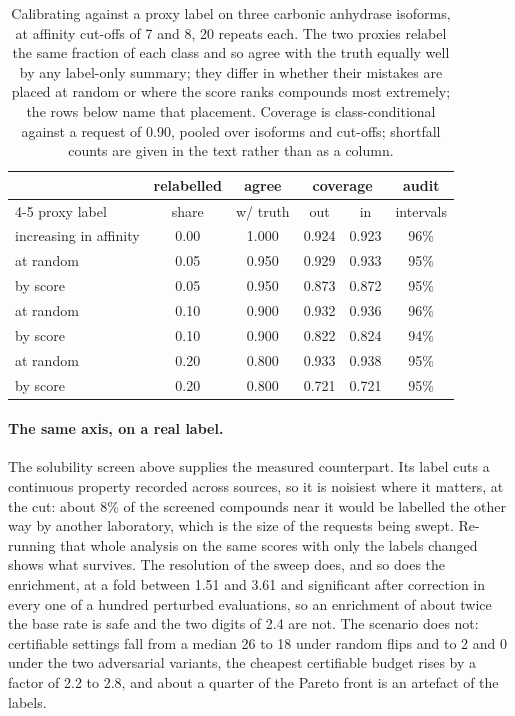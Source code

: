 \documentclass[twocolumn,10pt]{article}
\begin{document}
\begin{table}[t]
\centering
\caption{Calibrating against a proxy label on three carbonic anhydrase isoforms, at affinity cut-offs of 7 and 8, 20 repeats each. The two proxies relabel the same fraction of each class and so agree with the truth equally well by any label-only summary; they differ in whether their mistakes are placed at random or where the score ranks compounds most extremely; the rows below name that placement. Coverage is class-conditional against a request of 0.90, pooled over isoforms and cut-offs; shortfall counts are given in the text rather than as a column.}
\label{tab:surrogate}
\footnotesize
\setlength{\tabcolsep}{4pt}
\begin{tabular}{lccccc}
\toprule
 & relabelled & agree & \multicolumn{2}{c}{coverage} & audit \\
\cmidrule(lr){4-5}
proxy label & share & w/ truth & out & in & intervals \\
\midrule
increasing in affinity & 0.00 & 1.000 & 0.924 & 0.923 & 96\% \\
at random & 0.05 & 0.950 & 0.929 & 0.933 & 95\% \\
by score  & 0.05 & 0.950 & 0.873 & 0.872 & 95\% \\
at random & 0.10 & 0.900 & 0.932 & 0.936 & 96\% \\
by score  & 0.10 & 0.900 & 0.822 & 0.824 & 94\% \\
at random & 0.20 & 0.800 & 0.933 & 0.938 & 95\% \\
by score  & 0.20 & 0.800 & 0.721 & 0.721 & 95\% \\
\bottomrule
\end{tabular}
\end{table}


\paragraph{The same axis, on a real label.} The solubility screen above supplies the measured
counterpart. Its label cuts a continuous property recorded across sources, so it is noisiest
where it matters, at the cut: about 8\% of the screened compounds near it would be labelled the
other way by another laboratory, which is the size of the requests being swept. Re-running that
whole analysis on the same scores with only the labels changed shows what survives. The
resolution of the sweep does, and so does the enrichment, at a fold between 1.51 and 3.61 and
significant after correction in every one of a hundred perturbed evaluations, so an enrichment
of about twice the base rate is safe and the two digits of 2.4 are not. The scenario does not:
certifiable settings fall from a median 26 to 18 under random flips and to 2 and 0 under the two
adversarial variants, the cheapest certifiable budget rises by a factor of 2.2 to 2.8, and about
a quarter of the Pareto front is an artefact of the labels.
\end{document}
